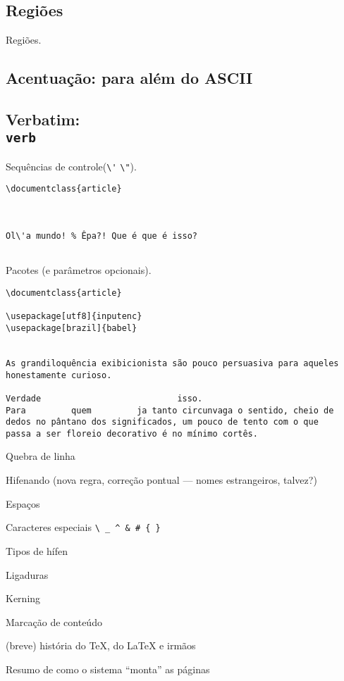 \subsection{Regiões}
Regiões.

\subsection{Acentuação: para além do ASCII}

\subsection{Verbatim: {\tt \\verb}}
Sequências de controle(\verb!\'! \verb!\"!).

\begin{verbatim}
\documentclass{article}
    

    
Ol\'a mundo! % Êpa?! Que é que é isso?
    

\end{verbatim}

Pacotes (e parâmetros opcionais).

\begin{verbatim}
\documentclass{article}
    
\usepackage[utf8]{inputenc}
\usepackage[brazil]{babel}


As grandiloquência exibicionista são pouco persuasiva para aqueles
honestamente curioso.
   
Verdade                           isso. 
Para         quem         ja tanto circunvaga o sentido, cheio de
dedos no pântano dos significados, um pouco de tento com o que
passa a ser floreio decorativo é no mínimo cortês.

\end{verbatim}

Quebra de linha

Hifenando (nova regra, correção pontual --- nomes estrangeiros,
talvez?)

Espaços

Caracteres especiais \verb!\ _ ^ & # { }!

Tipos de hífen

Ligaduras

Kerning

Marcação de conteúdo

(breve) história do TeX, do LaTeX e irmãos

Resumo de como o sistema ``monta'' as páginas

